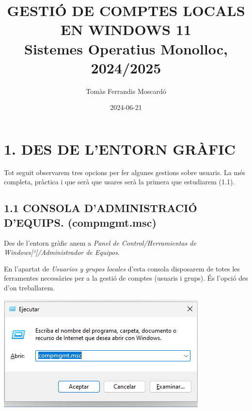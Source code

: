 \documentclass[
  a4paper,
]{article}
\title{GESTIÓ DE COMPTES LOCALS EN WINDOWS 11\\
Sistemes Operatius Monolloc, 2024/2025}
\author{Tomàs Ferrandis Moscardó}
\date{2024-06-21}
\begin{document}
\maketitle

{
\setcounter{tocdepth}{2}
\tableofcontents
}
\newpage

\renewcommand\tablename{Tabla}

\section{1. DES DE L'ENTORN GRÀFIC}\label{des-de-lentorn-gruxe0fic}

Tot seguit observarem tres opcions per fer algunes gestions sobre
usuaris. La més completa, pràctica i que serà que usares serà la primera
que estudiarem (1.1).

\subsection{1.1 CONSOLA D'ADMINISTRACIÓ D'EQUIPS.
(compmgmt.msc)}\label{consola-dadministraciuxf3-dequips.-compmgmt.msc}

Des de l'entorn gràfic anem a \emph{Panel de Control/Herramientas de
Windows{[}¹{]}/Administrador de Equipos}.

En l'apartat de \emph{Usuarios y grupos locales} d'esta consola
disposarem de totes les ferramentes necessàries per a la gestió de
comptes (usuaris i grups). És l'opció des d'on treballarem.

\includegraphics{png/WinRcompmgmt.png}
\end{document}
